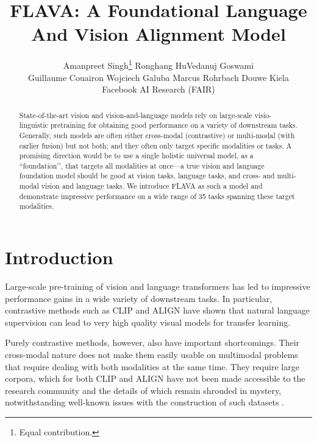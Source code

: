 \documentclass[10pt,twocolumn,letterpaper]{article}
\begin{document}
\title{FLAVA: A Foundational Language And Vision Alignment Model}

\newcommand*\samethanks[1][\value{footnote}]{\footnotemark[#1]}
\author{
Amanpreet Singh\thanks{Equal contribution.}  Ronghang Hu\samethanks  Vedanuj Goswami\samethanks\\
\vspace{0.25em}
Guillaume Couairon  Wojciech Galuba  Marcus Rohrbach  Douwe Kiela \\
\vspace{-0.5em}
Facebook AI Research (FAIR) \\
}
\maketitle

\vspace{-1em}
\begin{abstract}
\vspace{-0.5em}
State-of-the-art vision and vision-and-language models rely on large-scale visio-linguistic pretraining for obtaining good performance on a variety of downstream tasks. Generally, such models are often either cross-modal (contrastive) or multi-modal (with earlier fusion) but not both; and they often only target specific modalities or tasks. A promising direction would be to use a single holistic universal model, as a ``foundation’’, that targets all modalities at once---a true vision and language foundation model should be good at vision tasks, language tasks, and cross- and multi-modal vision and language tasks. We introduce FLAVA as such a model and demonstrate impressive performance on a wide range of 35 tasks spanning these target modalities.
\end{abstract}

\vspace{-1em}
\section{Introduction}

Large-scale pre-training of vision and language transformers has led to impressive performance gains in a wide variety of downstream tasks. In particular, contrastive methods such as CLIP \cite{radford2021learning} and ALIGN \cite{jia2021scaling} have shown that natural language supervision can lead to very high quality visual models for transfer learning.

Purely contrastive methods, however, also have important shortcomings. Their cross-modal nature does not make them easily usable on multimodal problems that require dealing with both modalities at the same time. They require large corpora, which for both CLIP and ALIGN have not been made accessible to the research community and the details of which remain shrouded in mystery, notwithstanding well-known issues with the construction of such datasets \cite{birhane2021multimodal}.
\end{document}
